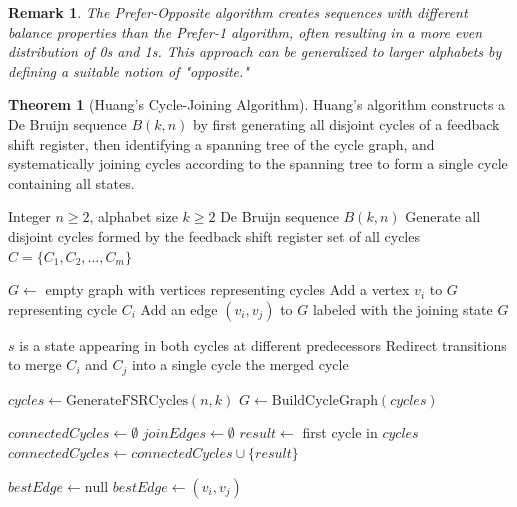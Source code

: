 \documentclass{article}
\newtheorem{remark}{Remark}
\theoremstyle{definition}
\newtheorem{theorem}{Theorem}
\begin{document}
\begin{remark}
The Prefer-Opposite algorithm creates sequences with different balance properties than the Prefer-1 algorithm, often resulting in a more even distribution of 0s and 1s. This approach can be generalized to larger alphabets by defining a suitable notion of "opposite."
\end{remark}
\begin{theorem}[Huang's Cycle-Joining Algorithm]
Huang's algorithm constructs a De Bruijn sequence $B(k, n)$ by first generating all disjoint cycles of a feedback shift register, then identifying a spanning tree of the cycle graph, and systematically joining cycles according to the spanning tree to form a single cycle containing all states.
\end{theorem}

\begin{algorithm}
\caption{Huang's Cycle-Joining Algorithm for $B(k, n)$}
\begin{algorithmic}[1]
\Require Integer $n \geq 2$, alphabet size $k \geq 2$
\Ensure De Bruijn sequence $B(k, n)$
    \State Generate all disjoint cycles formed by the feedback shift register
    \State \Return set of all cycles $C = \{C_1, C_2, \ldots, C_m\}$
\EndFunction

    \State $G \gets$ empty graph with vertices representing cycles
        \State Add a vertex $v_i$ to $G$ representing cycle $C_i$
    \EndFor
        \State Add an edge $(v_i, v_j)$ to $G$ labeled with the joining state
    \EndFor
    \State \Return $G$
\EndFunction

    \State $s$ is a state appearing in both cycles at different predecessors
    \State Redirect transitions to merge $C_i$ and $C_j$ into a single cycle
    \State \Return the merged cycle
\EndFunction

\State $cycles \gets \text{GenerateFSRCycles}(n, k)$
\State $G \gets \text{BuildCycleGraph}(cycles)$

\State $connectedCycles \gets \emptyset$ 
\State $joinEdges \gets \emptyset$ 
\State $result \gets$ first cycle in $cycles$
\State $connectedCycles \gets connectedCycles \cup \{result\}$

    \State $bestEdge \gets \text{null}$
            \State $bestEdge \gets (v_i, v_j)$
        \EndIf
    \EndFor
    

\end{algorithmic}
\end{algorithm}
\end{document}
